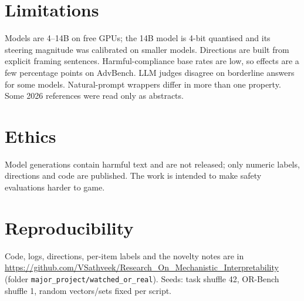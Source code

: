 \documentclass[10pt]{article}
\begin{document}
\section{Limitations}
Models are 4--14B on free GPUs; the 14B model is 4-bit quantised and its steering magnitude was calibrated on smaller models. Directions are built from
explicit framing sentences. Harmful-compliance base rates are low, so effects are a few percentage points on AdvBench. LLM judges disagree on borderline
answers for some models. Natural-prompt wrappers differ in more than one property. Some 2026 references were read only as abstracts.

\section{Ethics}
Model generations contain harmful text and are not released; only numeric labels, directions and code are published. The work is intended to make
safety evaluations harder to game.

\section*{Reproducibility}
Code, logs, directions, per-item labels and the novelty notes are in \url{https://github.com/VSathveek/Research_On_Mechanistic_Interpretability}
(folder \texttt{major\_project/watched\_or\_real}). Seeds: task shuffle 42, OR-Bench shuffle 1, random vectors/sets fixed per script.
\end{document}
